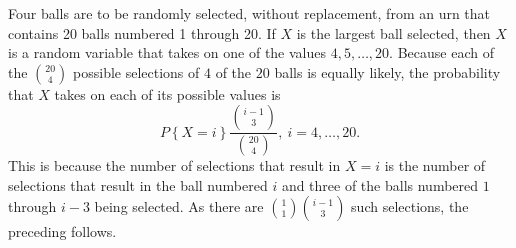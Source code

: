\begin{changebar}
    \begin{example}
        Four balls are to be randomly selected, without replacement, from an urn that contains 20 balls numbered 1 through 20. If $X$ is the largest ball selected, then $X$ is a random variable that takes on one of the values $4, 5, \dots, 20$. Because each of the $\displaystyle \binom{20}{4}$ possible selections of $4$ of the $20$ balls is equally likely, the probability that $X$ takes on each of its possible values is \[
            P\left\{ X = i \right\}\frac{\binom{i - 1}{3}}{\binom{20}{4}},\: i = 4, \dots, 20.    
        \] This is because the number of selections that result in $X = i$ is the number of selections that result in the ball numbered $i$ and three of the balls numbered $1$ through $i - 3$ being selected. As there are $\displaystyle \binom{1}{1}\binom{i - 1}{3}$ such selections, the preceding follows.
    \end{example}
\end{changebar}

